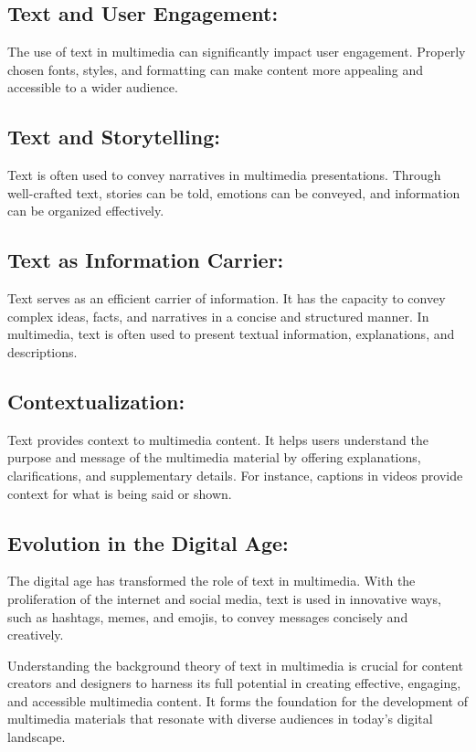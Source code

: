 \documentclass[12pt]{report}
\begin{document}
\subsection*{Text and User Engagement:} The use of text in multimedia can significantly impact user engagement. Properly chosen fonts, styles, and formatting can make content more appealing and accessible to a wider audience.\cite{user}
\subsection*{Text and Storytelling:} Text is often used to convey narratives in multimedia presentations. Through well-crafted text, stories can be told, emotions can be conveyed, and information can be organized effectively.\cite{storytelling}
\subsection*{Text as Information Carrier:} Text serves as an efficient carrier of information. It has the capacity to convey complex ideas, facts, and narratives in a concise and structured manner. In multimedia, text is often used to present textual information, explanations, and descriptions.
\subsection*{Contextualization:} Text provides context to multimedia content. It helps users understand the purpose and message of the multimedia material by offering explanations, clarifications, and supplementary details. For instance, captions in videos provide context for what is being said or shown.
\subsection*{Evolution in the Digital Age:} The digital age has transformed the role of text in multimedia. With the proliferation of the internet and social media, text is used in innovative ways, such as hashtags, memes, and emojis, to convey messages concisely and creatively.

Understanding the background theory of text in multimedia is crucial for content creators and designers to harness its full potential in creating effective, engaging, and accessible multimedia content. It forms the foundation for the development of multimedia materials that resonate with diverse audiences in today's digital landscape.\cite{theory}


\newpage
\end{document}

